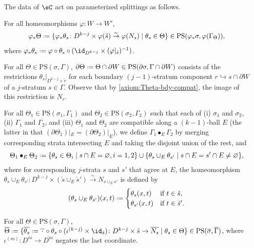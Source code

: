\documentclass[12pt,reqno]{amsart}
\newcommand{\C}{\eC}
\newcommand{\blt}{\bullet}
\newcommand{\fcj}[1]{\overline{#1}}
\newcommand{\orev}{\overline}
\DeclareRobustCommand{\coloneq}{\mathrel{\vcenter{\baselineskip0.5ex\lineskiplimit0pt\hbox{\scriptsize{\upshape.}}\hbox{\scriptsize{\upshape.}}}}=}
\begin{document}
The data of $\C$ act on parameterized splittings as follows.
\begin{lst}  \item[($\Theta\varphi$)]\label{axiom:Theta-phi} For all homeomorphisms $\varphi\colon W\to W'$,
  \[
    \varphi_*\Theta\coloneq\{\varphi_*\theta_s\colon D^{k-j}\times\varphi(\check{s})\overset\sim\to\varphi(N_s)\mid\theta_s\in\Theta\}\in\mathrm{PS}(\varphi_*\sigma,\varphi(\Gamma_\Theta)),
  \]
  where $\varphi_*\theta_s\coloneq\varphi\circ\theta_s\circ(\id_{D^{k-j}}\times(\varphi|_{\check{s}})^{-1})$.
  \item[($\Theta\partial$)]\label{axiom:Theta-bdy} For all $\Theta \in \mathrm{PS}(\sigma, \Gamma)$, $\partial\Theta \coloneq \Theta \cap \partial W \in \mathrm{PS}(\partial\sigma, \Gamma \cap \partial W)$ consists of the restrictions $\theta_s|_{D^{k-j} \times \check{r}}$ for each boundary $(j-1)$-stratum component $r\hookrightarrow s\cap \partial W$ of a $j$-stratum $s \in \Gamma$. Observe that by \ref{axiom:Theta-bdy-compat}, the image of this restriction is $N_r$.
  \item[($\Theta$G)]\label{axiom:Theta-G} For all $\Theta_1\in\mathrm{PS}(\sigma_1,\Gamma_1)$ and $\Theta_2\in\mathrm{PS}(\sigma_2,\Gamma_2)$ such that each of (i) $\sigma_1$ and $\sigma_2$, (ii) $\Gamma_1$ and $\Gamma_2$, and (iii) $\Theta_1$ and $\Theta_2$ are compatible along a $(k-1)$-ball $E$ (the latter in that $(\partial\Theta_1)|_E=(\partial\Theta_2)|_E$), we define $\Gamma_1\blt_E\Gamma_2$ by merging corresponding strata intersecting $E$ and taking the disjoint union of the rest, and
  \[
    \Theta_1\blt_E\Theta_2\coloneq\{\theta_s\in\Theta_i\mid s\cap E=\varnothing,i=1,2\}\cup\{\theta_s\cup_E\theta_{s'}\mid s\cap E=s'\cap E\neq\varnothing\},
  \]
  where for corresponding $j$-strata $s$ and $s'$ that agree at $E$, the homeomorphism $\theta_s\cup_E\theta_{s'}\colon D^{k-j}\times(\check{s}\cup_E\check{s}')\overset\sim\to N_{s\cup_E s'}$ is defined by
  \[
    (\theta_s\cup_E\theta_{s'})(x,t)\coloneq
    \begin{cases}
      \theta_s(x,t) & \text{if }t\in\check{s},\\
      \theta_{s'}(x,t) & \text{if }t\in\check{s}'.
    \end{cases}
  \]
  \item[($\Theta\orev{\,\cdot\,}$)]\label{axiom:Theta-refl} For all $\Theta\in\mathrm{PS}(\sigma,\Gamma)$, $\orev\Theta\coloneq\{\orev{\theta_s}\coloneq\orev{\,\cdot\,}\circ\theta_s\circ(\iota^{(k-j)}\times\id_{\check{s}})\colon D^{k-j}\times\check{s}\to\orev{N_s}\mid\theta_s\in\Theta\}\in\mathrm{PS}(\fcj\sigma,\orev\Gamma)$, where $\iota^{(m)}\colon D^m\to\orev{D^m}$ negates the last coordinate.
\end{lst}
\end{document}
